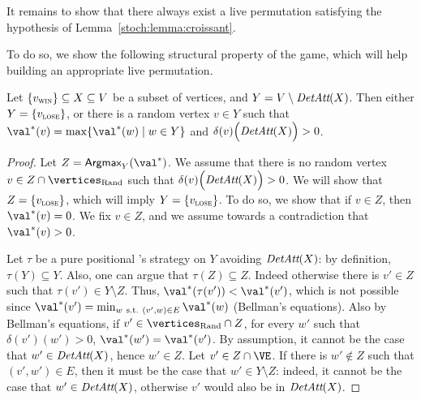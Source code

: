 It remains to show that there always exist  a live permutation
satisfying the hypothesis of Lemma~\ref{stoch:lemma:croissant}.

To do so, we show the following structural property of the game, which
will help building an appropriate live permutation.

\begin{lemma}
  \label{stoch:lemma:structure}
  Let $\{v_{\textsc{win}}\} \subseteq X \subseteq V$ be a subset of vertices, and
  $Y = V \setminus \textit{DetAtt}(X)$. Then either $Y = \{v_{\textsc{lose}}\}$, or there
  is a random vertex $v \in Y$ such that $\val^*(v) = \max\{\val^*(w)
  \mid w \in Y\}$ and $\delta(v)\Big(\textit{DetAtt}(X)\Big)>0$.
\end{lemma}

\begin{proof}
  Let $Z = \textsf{Argmax}_Y (\val^*)$. We assume that there is no
  random vertex $v \in Z \cap \Randomvertices$ such that
  $\delta(v)\Big(\textit{DetAtt}(X)\Big)>0$. We will show that $Z =
  \{v_{\textsc{lose}}\}$, which will imply $Y = \{v_{\textsc{lose}}\}$. To do so, we show
  that if $v \in Z$, then $\val^*(v) = 0$.  We fix $v \in Z$, and we
  assume towards a contradiction that $\val^*(v)>0$.

  Let $\tau$ be a pure positional \Adam's strategy on $Y$ avoiding
  $\textit{DetAtt}(X)$: by definition, $\tau(Y) \subseteq Y$. Also, one can
  argue that $\tau(Z) \subseteq Z$. Indeed otherwise there is $v' \in
  Z$ such that $\tau(v') \in Y \setminus Z$. Thus, $\val^*(\tau(v')) <
  \val^*(v')$, which is not possible since $\val^*(v') = \min_{w\
    \text{s.t.}\ (v',w) \in E} \val^*(w)$ (Bellman's equations). Also
  by Bellman's equations, if $v' \in \Randomvertices \cap Z$, for
  every $w'$ such that $\delta(v')(w')>0$, $\val^*(w') =
  \val^*(v')$. By assumption, it cannot be the case that $w' \in
  \textit{DetAtt}(X)$, hence $w' \in Z$.  Let $v' \in Z \cap \Evevertices$. If
  there is $w' \notin Z$ such that $(v',w') \in E$, then it must be
  the case that $w' \in Y \setminus Z$: indeed, it cannot be the case
  that $w' \in \textit{DetAtt}(X)$, otherwise $v'$ would also be in
  $\textit{DetAtt}(X)$.


\end{proof}
